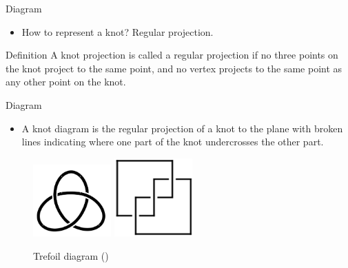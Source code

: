 \documentclass[]{beamer}
\begin{document}
\begin{frame}{Diagram}
\begin{itemize}
    \item How to represent a knot? Regular projection.
\end{itemize}
\begin{kulblock}{Definition}
    A knot projection is called a regular projection if no three points on the knot project to the same point, and no vertex
projects to the same point as any other point on the knot.
\end{kulblock}
    
\end{frame}

\begin{frame}{Diagram}

\begin{itemize}
    \item A knot diagram is the regular projection of a knot to the plane with broken
lines indicating where one part of the knot undercrosses the other part.
\end{itemize}
\begin{figure}
    \centering
\includegraphics[width=3cm]{Pictures/trefoil.png}
\includegraphics[width=3cm]{Pictures/31.png}
    \caption{Trefoil diagram (\cite{trefoil})}
    \label{fig:enter-label}
\end{figure}
\end{frame}
\end{document}
